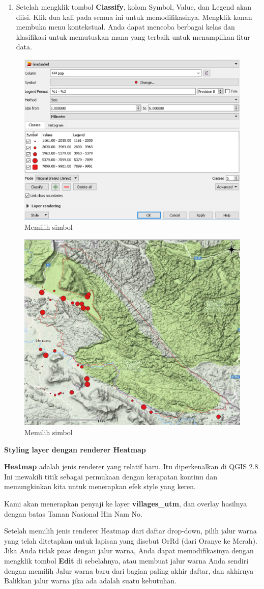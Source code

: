 \documentclass[]{book}
\providecommand{\tightlist}{%
  \setlength{\itemsep}{0pt}\setlength{\parskip}{0pt}}
\begin{document}
\begin{enumerate}
\def\labelenumi{\arabic{enumi}.}
\setcounter{enumi}{6}
\tightlist
\item
  Setelah mengklik tombol \textbf{Classify}, kolom Symbol, Value, dan Legend akan diisi. Klik dua kali pada semua ini untuk memodifikasinya. Mengklik kanan membuka menu kontekstual. Anda dapat mencoba berbagai kelas dan klasifikasi untuk memutuskan mana yang terbaik untuk menampilkan fitur data.
\end{enumerate}

\begin{figure}

{\centering \includegraphics[width=0.3\linewidth]{images/09/fig97} 

}

\caption{Memilih simbol}\label{fig:fig97}
\end{figure}

\begin{figure}

{\centering \includegraphics[width=0.3\linewidth]{images/09/fig98} 

}

\caption{Memilih simbol}\label{fig:fig98}
\end{figure}

\textbf{Styling layer dengan renderer Heatmap}

\textbf{Heatmap} adalah jenis renderer yang relatif baru. Itu diperkenalkan di QGIS 2.8. Ini mewakili titik sebagai permukaan dengan kerapatan kontinu dan memungkinkan kita untuk menerapkan efek style yang keren.

Kami akan menerapkan penyaji ke layer \textbf{villages\_utm}, dan overlay hasilnya dengan batas Taman Nasional Hin Nam No.

Setelah memilih jenis renderer Heatmap dari daftar drop-down, pilih jalur warna yang telah ditetapkan untuk lapisan yang disebut OrRd (dari Oranye ke Merah). Jika Anda tidak puas dengan jalur warna, Anda dapat memodifikasinya dengan mengklik tombol \textbf{Edit} di sebelahnya, atau membuat jalur warna Anda sendiri dengan memilih Jalur warna baru dari bagian paling akhir daftar, dan akhirnya Balikkan jalur warna jika ada adalah suatu kebutuhan.
\end{document}

